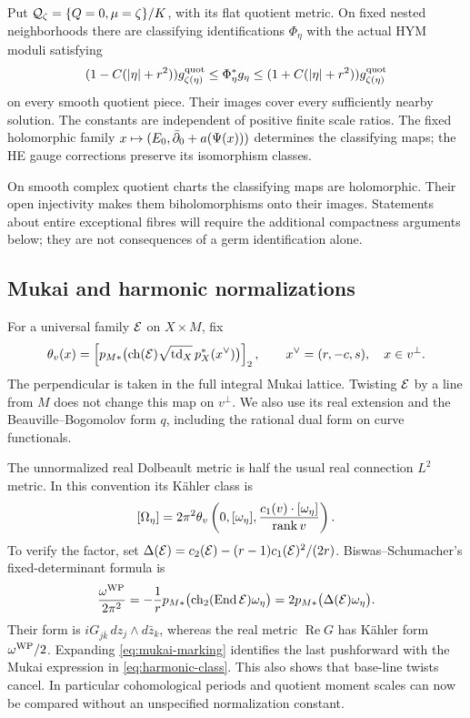 \begin{corollary}\label{cor:harmonic-comparison}
Put $\mathcal Q_\zeta=\{Q=0,\mu=\zeta\}/K$, with its flat quotient
metric. On fixed nested neighborhoods there are classifying
identifications $\Phi_\eta$ with the actual HYM moduli satisfying
\begin{equation}\label{eq:actual-quotient-comparison}
 (1-C(|\eta|+r^2))g^{\rm quot}_{\zeta(\eta)}
 \le\Phi_\eta^*g_\eta
 \le(1+C(|\eta|+r^2))g^{\rm quot}_{\zeta(\eta)}
\end{equation}
on every smooth quotient piece. Their images cover every sufficiently
nearby solution. The constants are independent of positive finite
scale ratios. The fixed holomorphic family
$x\mapsto(E_0,\bar\partial_0+a(\Psi(x)))$ determines the classifying
maps; the HE gauge corrections preserve its isomorphism classes.
\end{corollary}

On smooth complex quotient charts the classifying maps are
holomorphic. Their open injectivity makes them biholomorphisms
onto their images. Statements about entire exceptional fibres
will require the additional compactness arguments below; they
are not consequences of a germ identification alone.

\subsection{Mukai and harmonic normalizations}
For a universal family $\mathcal E$ on $X\times M$, fix
\begin{equation}\label{eq:mukai-marking}
 \theta_v(x)=\left[p_{M*}\bigl(\operatorname{ch}(\mathcal E)
       \sqrt{\operatorname{td}_X}\,p_X^*(x^\vee)\bigr)\right]_2,
 \qquad x^\vee=(r,-c,s),\quad x\in v^\perp.
\end{equation}
The perpendicular is taken in the full integral Mukai lattice.
Twisting $\mathcal E$ by a line from $M$ does not change this map on
$v^\perp$. We also use its real extension and the
Beauville--Bogomolov form $q$, including the rational dual form
on curve functionals.

The unnormalized real Dolbeault metric is half the usual real
connection $L^2$ metric. In this convention its K\"ahler class is
\begin{equation}\label{eq:harmonic-class}
 [\Omega_\eta]=2\pi^2\theta_v\left(
  0,[\omega_\eta],
       \frac{c_1(v)\cdot[\omega_\eta]}{\operatorname{rank} v}\right).
\end{equation}
To verify the factor, set
$\Delta(\mathcal E)=c_2(\mathcal E)-(r-1)c_1(\mathcal E)^2/(2r)$.
Biswas--Schumacher's fixed-determinant formula
\cite[Proposition~4.3, (4.6)]{biswasschumacher} is
\[
 \frac{\omega^{\rm WP}}{2\pi^2}
 =-\frac1r p_{M*}\bigl(\operatorname{ch}_2(\operatorname{End}\mathcal E)\omega_\eta\bigr)
 =2p_{M*}\bigl(\Delta(\mathcal E)\omega_\eta\bigr).
\]
Their form is $iG_{j\bar k}\,dz_j\wedge d\bar z_k$, whereas
the real metric $\operatorname{Re}G$ has K\"ahler form
$\omega^{\rm WP}/2$. Expanding
\eqref{eq:mukai-marking} identifies the last pushforward with
the Mukai expression in \eqref{eq:harmonic-class}. This also
shows that base-line twists cancel. In particular cohomological
periods and quotient moment scales can now be compared without
an unspecified normalization constant.


